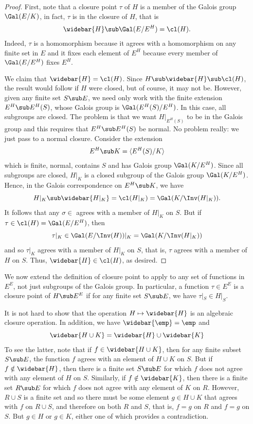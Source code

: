 \begin{proof}
First, note that a closure point $\tau$ of $H$ is a member of the Galois group $\Gal(E/K)$, in fact, $\tau$ is in the closure of $H$, that is
\[\widebar{H}\sub\Gal(E/E^H)=\cl(H).\]
Indeed, $\tau$ is a homomorphism because it agrees with a homomorphism on any finite set in $E$ and it fixes each element of $E^H$ because every member of $\Gal(E/E^H)$ fixes $E^H$.\par
We claim that $\widebar{H}=\cl(H)$. Since $H\sub\widebar{H}\sub\cl(H)$, the result would follow if $H$ were closed, but of course, it may not be. However, given any finite set $S\sub E$, we need only work with the finite extension $E^H\sub E^H(S)$, whose Galois group is $\Gal(E^H(S)/E^H)$. In this case, all subgroups are closed. The problem is that we want $H|_{E^H(S)}$ to be in the Galois group and this requires that $E^H\sub E^H(S)$ be normal. No problem really: we just pass to a normal closure. Consider the extension
\[E^H\sub K=\langle E^H(S)/K\rangle\]
which is finite, normal, contains $S$ and has Galois group $\Gal(K/E^H)$. Since all subgroups are closed, $H|_K$ is a closed subgroup of the Galois group $\Gal(K/E^H)$. Hence, in the Galois correspondence on $E^H\sub K$, we have
\[H|_K\sub\widebar{H|_K}=\cl(H|_K)=\Gal(K/\Inv(H|_K)).\]
It follows that any $\sigma\in $ agrees with a member of $H|_K$ on $S$. But if $\tau\in\cl(H)=\Gal(E/E^H)$, then
\[\tau|_K\in\Gal(E/\Inv(H))|_K=\Gal(K/\Inv(H|_K))\]
and so $\tau|_K$ agrees with a member of $H|_K$ on $S$, that is, $\tau$ agrees with a member of $H$ on $S$. Thus, $\widebar{H}\in\cl(H)$, as desired.
\end{proof}
We now extend the definition of closure point to apply to any set of functions in $E^E$, not just subgroups of the Galois group. In particular, a function $\tau\in E^E$ is a closure point of $H\sub E^E$ if for any finite set $S\sub E$, we have $\tau|_S\in H|_S$.\par
It is not hard to show that the operation $H\mapsto\widebar{H}$ is an algebraic closure operation. In addition, we have $\widebar{\emp}=\emp$ and
\[\widebar{H\cup K}=\widebar{H}\cup\widebar{K}\]
To see the latter, note that if $f\in\widebar{H\cup K}$, then for any finite subset $S\sub E$, the function $f$ agrees with an element of $H\cup K$ on $S$. But if $f\notin\widebar{H}$, then there is a finite set $S\sub E$ for which $f$ does not agree with any element of $H$ on $S$. Similarly, if $f\notin\widebar{K}$, then there is a finite set $R\sub E$ for which $f$ does not agree with any element of $K$ on $R$. However, $R\cup S$ is a finite set and so there must be some element $g\in H\cup K$ that agrees with $f$ on $R\cup S$, and therefore on both $R$ and $S$, that is, $f=g$ on $R$ and $f=g$ on $S$. But $g\in H$ or $g\in K$, either one of which provides a contradiction.\par
